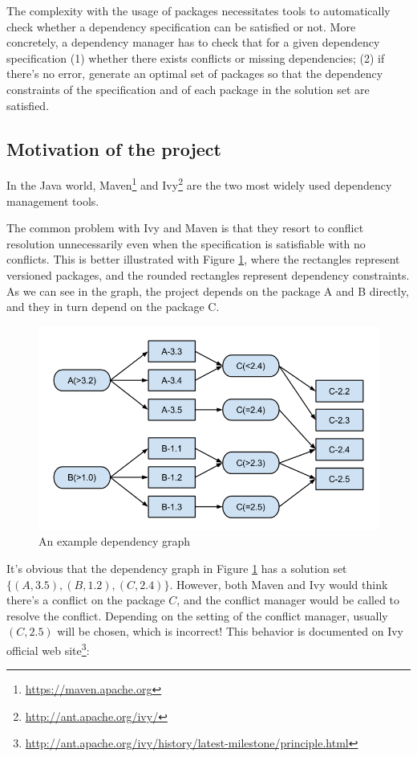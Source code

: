 The complexity with the usage of packages necessitates tools to automatically check whether a dependency specification can be satisfied or not. More concretely, a dependency manager has to check that for a given dependency specification (1) whether there exists conflicts or missing dependencies; (2) if there's no error, generate an optimal set of packages so that the dependency constraints of the specification and of each package in the solution set are satisfied.


\subsection{Motivation of the project}

In the Java world, Maven\footnote{\url{https://maven.apache.org}} and Ivy\footnote{\url{http://ant.apache.org/ivy/}} are the two most widely used dependency management tools.

The common problem with Ivy and Maven is that they resort to conflict resolution unnecessarily even when the specification is satisfiable with no conflicts. This is better illustrated with Figure \ref{fig:introuction:underconstraint}, where the rectangles represent versioned packages, and the rounded rectangles represent dependency constraints.  As we can see in the graph, the project depends on the package A and B directly, and they in turn depend on the package C.

\begin{figure}[ht]
  \center
  \includegraphics[width=14cm]{img/introduction/underconstraint.png}
  \caption[An example dependency graph]{An example dependency graph \label{fig:introuction:underconstraint}}
\end{figure}

It's obvious that the dependency graph in Figure \ref{fig:introuction:underconstraint} has a solution set $\{(A, 3.5), (B, 1.2), (C, 2.4)\}$. However, both Maven and Ivy would think there's a conflict on the package $C$, and the conflict manager would be called to resolve the conflict. Depending on the setting of the conflict manager, usually $(C, 2.5)$ will be chosen, which is incorrect! This behavior is documented on Ivy official web site\footnote{\url{http://ant.apache.org/ivy/history/latest-milestone/principle.html}}:

